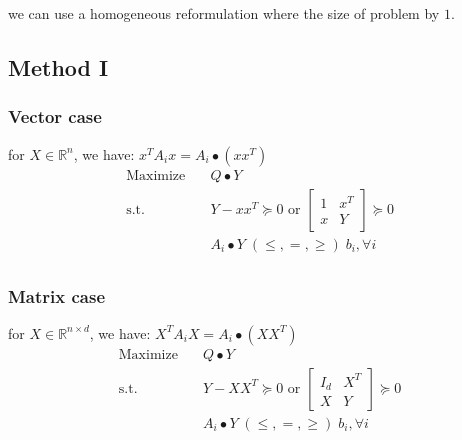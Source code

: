 \documentclass[../main]{subfiles}
\begin{document}
we can use a homogeneous reformulation where the size of problem by $1$.


\subsection{Method I}\label{sdp-method-1}

\subsubsection{Vector case}
for \(X \in \mathbb{R}^{n}\), we have: \(x^{T} A_{i} x = A_i \bullet (xx^T)\)
\begin{equation}
  \begin{aligned}
    \mathrm{Maximize}\quad & Q\bullet Y                                                        \\
    \mathrm{s.t.}  \quad   & Y-xx^T \succeq 0 \text { or } \begin{bmatrix} 1 & x^{T} \\ x & Y \end{bmatrix} \succeq 0 \\
                           & A_i \bullet Y \; (\le, =, \ge) \; b_i, \forall i                  \\
  \end{aligned}
\end{equation}

\subsubsection{Matrix case}
for \(X \in \mathbb{R}^{n\times d}\), we have: \(X^{T} A_{i} X = A_i \bullet (XX^T)\)
\begin{equation}
  \begin{aligned}
    \mathrm{Maximize}\quad & Q\bullet Y                                                       \\
    \mathrm{s.t.}  \quad   & Y-XX^T \succeq 0 \text { or }\begin{bmatrix} I_d & X^{T} \\ X & Y \end{bmatrix} \succeq 0 \\
                           & A_i \bullet Y \; (\le, =, \ge) \; b_i, \forall i                 \\
  \end{aligned}
\end{equation}
\end{document}
